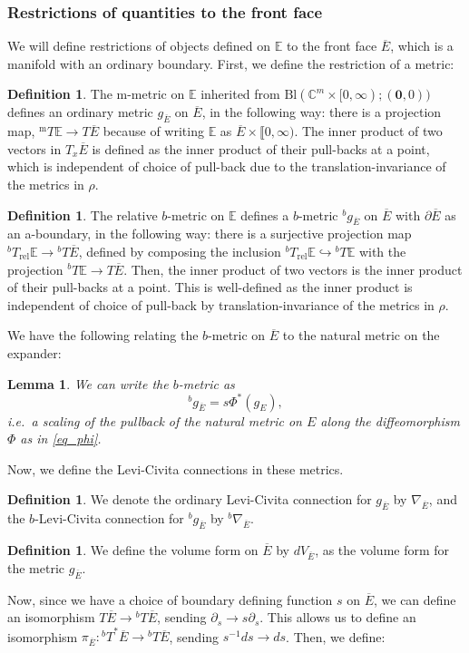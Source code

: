 \documentclass[10pt, a4paper]{article}
\theoremstyle{plain}%
\newtheorem{lem}[theorem]{Lemma}
\theoremstyle{definition}
\newtheorem{defn}[theorem]{Definition}
\numberwithin{figure}{section}
\numberwithin{equation}{section}
\newcommand{\bE}{\mathbb{E}}
\newcommand{\pa}{\partial}
\newcommand{\rt}{\rightarrow}
\newcommand{\rel}{\mathrm{rel}}
\newcommand{\oE}{{\overline{E}}}
\newcommand{\Bl}{\mathrm{Bl}(\mathbb{C}^m\times[0,\infty); (\mathbf{0},0))}
\newcommand{\m}{\mathrm{m}}
\begin{document}
\subsubsection{Restrictions of quantities to the front face}
We will define restrictions of objects defined on $\bE$ to the front face $\oE$, which is a manifold with an ordinary boundary. First, we define the restriction of a metric:

\begin{defn}
	The m-metric on $\bE$ inherited from $\Bl$ defines an ordinary metric $g_{\oE}$ on $\oE$, in the following way: there is a projection map, $^{\m}T\bE\rt T\oE$ because of writing $\bE$ as $\oE\times \llbracket0,\infty)$. The inner product of two vectors in $T_x\oE$ is defined as the inner product of their pull-backs at a point, which is independent of choice of pull-back due to the translation-invariance of the metrics in $\rho$.
\end{defn}
\begin{defn}
	The relative $b$-metric on $\bE$ defines a $b$-metric $^bg_{\oE}$ on $\oE$ with $\pa\oE$ as an a-boundary, in the following way: there is a surjective projection map $^bT_\rel \bE \rt {^bT}\oE$, defined by composing the inclusion $^bT_\rel\bE\hookrightarrow {^bT}\bE$ with the projection $^{b}T\bE \rightarrow T\oE$. Then, the inner product of two vectors is the inner product of their pull-backs at a point. This is well-defined as the inner product is independent of choice of pull-back by translation-invariance of the metrics in $\rho$.
\end{defn}
We have the following relating the $b$-metric on $\oE$ to the natural metric on the expander:
\begin{lem}
	We can write the $b$-metric as \[
	^bg_{\oE}=s\Phi^*(g_E),
	\] i.e.\ a scaling of the pullback of the natural metric on $E$ along the diffeomorphism $\Phi$ as in \eqref{eq_phi}.
\end{lem}
 
Now, we define the Levi-Civita connections in these metrics. 
\begin{defn}
	We denote the ordinary Levi-Civita connection for $g_\oE$ by $\nabla_\oE$, and the $b$-Levi-Civita connection for $^bg_\oE$ by $^b\nabla_{\oE}$. 
\end{defn}
\begin{defn}
	We define the volume form on $\oE$ by $dV_{\oE}$, as the volume form for the metric $g_{\oE}$.
\end{defn}
Now, since we have a choice of boundary defining function $s$ on $\oE$, we can define an isomorphism $T\oE \rightarrow {^bT}\oE$, sending $\pa_s\rightarrow s\pa_s$. This allows us to define an isomorphism $\pi_{\oE}: {^bT}^*\oE \rt {^bT}\oE$, sending $s^{-1}ds\rt ds$. Then, we define:
\end{document}

